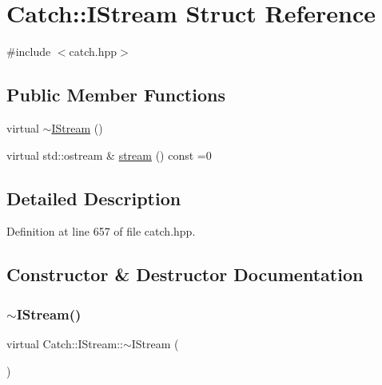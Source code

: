 \hypertarget{struct_catch_1_1_i_stream}{}\section{Catch\+:\+:I\+Stream Struct Reference}
\label{struct_catch_1_1_i_stream}


{\ttfamily \#include $<$catch.\+hpp$>$}

\subsection*{Public Member Functions}
\begin{DoxyCompactItemize}
\item 
virtual \mbox{\hyperlink{struct_catch_1_1_i_stream_a344a88d0e5fc1f727f5801c72b4a4e2a}{$\sim$\+I\+Stream}} ()
\item 
virtual std\+::ostream \& \mbox{\hyperlink{struct_catch_1_1_i_stream_a55a9ddbe250261ff38642f480ebdd902}{stream}} () const =0
\end{DoxyCompactItemize}


\subsection{Detailed Description}


Definition at line 657 of file catch.\+hpp.



\subsection{Constructor \& Destructor Documentation}
\mbox{\label{struct_catch_1_1_i_stream_a344a88d0e5fc1f727f5801c72b4a4e2a}} 
\subsubsection{\texorpdfstring{$\sim$\+I\+Stream()}{~IStream()}}
{\footnotesize\ttfamily virtual Catch\+::\+I\+Stream\+::$\sim$\+I\+Stream (\begin{DoxyParamCaption}{ }\end{DoxyParamCaption})\hspace{0.3cm}{\ttfamily [virtual]}}



